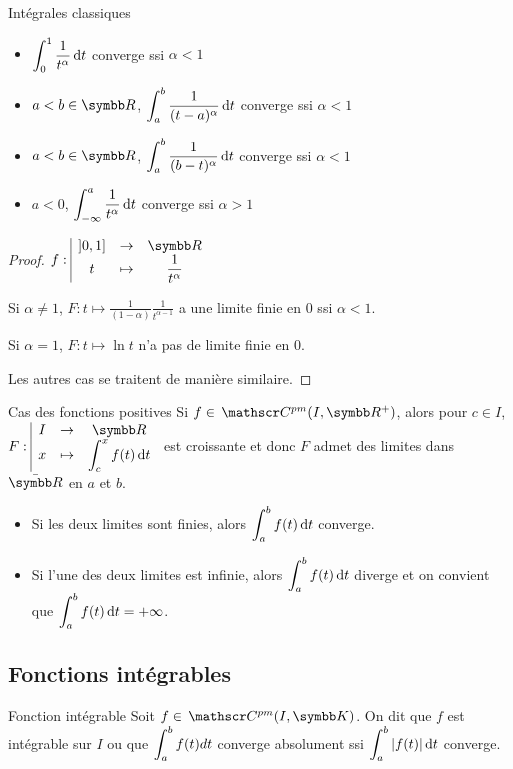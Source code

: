 \begin{theoreme}{Intégrales classiques}{}
    
    \begin{itemize}
        \item $\displaystyle \int_0^1 \frac{1}{t^\alpha} \,\mathrm{d}t$ converge ssi $\alpha < 1$
        \item $a < b \in \R$, $\displaystyle \int_{a }^{b } \frac 1 {(t - a)^\alpha} \,\mathrm{d}t$ converge ssi $\alpha < 1$
        \item $a < b \in \R$, $\displaystyle \int_{a }^{b } \frac 1 {(b - t)^\alpha} \,\mathrm{d}t$ converge ssi $\alpha < 1$
        \item $a < 0$, $\displaystyle \int_{- \infty}^a \frac 1 {t^\alpha} \,\mathrm{d}t$ converge ssi $\alpha > 1$
    \end{itemize}
\end{theoreme}

\begin{proof}
    $\fonction f {]0, 1]}{\R}{t}{\frac{1}{t^\alpha}}$ 

    Si $\alpha \neq 1$, $F : t \mapsto \frac 1 {(1 - \alpha)} \frac{1}{t^{\alpha - 1}}$ a 
    une limite finie en $0$ ssi $\alpha < 1$. 

    Si $\alpha = 1$, $F : t \mapsto \ln t$ n'a pas de limite finie en $0$.

    Les autres cas se traitent de manière similaire. 
\end{proof}


\begin{proposition}{Cas des fonctions positives}{}
    Si $f \in \mc{pm}(I, \R^+)$, alors pour $c \in I$, $\fonction{F}{I}{\R}{x}{\int_c^x f(t) \dt}$ est croissante
    et donc $F$ admet des limites dans $\bar{\R}$ en $a$ et $b$.

    \begin{itemize}
        \item Si les deux limites sont finies, alors $\displaystyle \int_a^b f(t) \,\mathrm{d}t$ converge.
        \item Si l'une des deux limites est infinie, alors $\displaystyle \int_a^b f(t) \,\mathrm{d}t$ diverge et on convient 
        que $\displaystyle \int_a^b f(t) \,\mathrm{d}t = + \infty$.
    \end{itemize}
\end{proposition}


\subsection{Fonctions intégrables }

\begin{definition}{Fonction intégrable}{}
    Soit $f \in \mc{pm}(I, \K)$. On dit que $f$ est intégrable sur $I$ ou que 
    $\displaystyle \int_a^b f(t) dt$ converge absolument ssi $\displaystyle \int_a^b |f(t)| \,\mathrm{d}t$ converge.
\end{definition}

